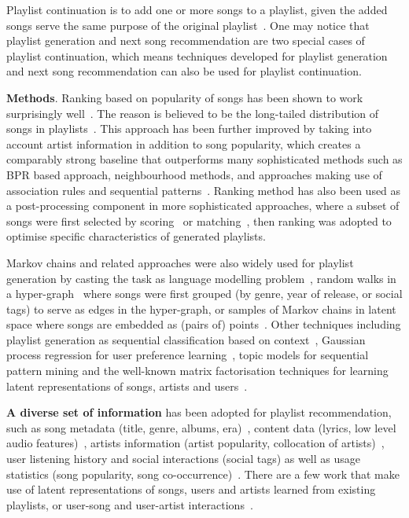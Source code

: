 Playlist continuation is to add one or more songs to a playlist,
given the added songs serve the same purpose of the original playlist~\cite{schedl2017,recsysch2018}.
One may %
notice that playlist generation and next song recommendation are two special cases
of playlist continuation, which means techniques developed for playlist generation and
next song recommendation can also be used for playlist continuation.


{\bf Methods}.
Ranking based on popularity of songs has been shown to
work surprisingly well~\cite{mcfee2012million,bonnin2013evaluating,bonnin2015automated}.
The reason is believed to be the long-tailed distribution of songs in
playlists~\cite{cremonesi2010performance,bonnin2013evaluating}.
%
This approach has been further improved by taking into account artist information in addition to
song popularity, which creates a comparably strong baseline that outperforms many sophisticated
methods such as BPR based approach, neighbourhood methods, and approaches
making use of association rules and sequential patterns~\cite{mcfee2012million,bonnin2013evaluating}.
%
Ranking method has also been used as a post-processing component in more sophisticated approaches,
where a subset of songs were first selected by scoring~\cite{jannach2015beyond} or matching~\cite{hariri2012context},
then ranking was adopted to optimise specific characteristics of generated playlists.


Markov chains and related approaches were also widely used for playlist generation by casting the task
as language modelling problem~\cite{mcfee2011natural},
random walks in a hyper-graph~\cite{mcfee2012hypergraph} where songs were first grouped (by genre,
year of release, or social tags) to serve as edges in the hyper-graph, or samples of Markov chains
in latent space where songs are embedded as (pairs of) points~\cite{chen2012playlist}.
%
Other techniques including playlist generation as sequential classification based on context~\cite{ben2017groove},
Gaussian process regression for user preference learning~\cite{platt2002learning},
topic models for sequential pattern mining and the well-known matrix factorisation techniques for learning
latent representations of songs, artists and users~\cite{mcfee2012hypergraph,chen2012playlist,ben2017groove}.


{\bf A diverse set of information} has been adopted for playlist recommendation,
such as song metadata (\eg title, genre, albums, era)~\cite{hariri2012context,platt2002learning}, %
content data (\eg lyrics, low level audio features)~\cite{mcfee2011natural,mcfee2012hypergraph,jannach2015beyond,ben2017groove},
artists information (\eg artist popularity, collocation of artists)~\cite{bonnin2013evaluating,ben2017groove},
user listening history and social interactions (\eg social tags) as well as usage statistics (\eg song popularity,
song co-occurrence)~\cite{mcfee2012hypergraph,hariri2012context,bonnin2013evaluating,jannach2015beyond,ben2017groove}.
There are a few work that make use of latent representations of songs, users and artists learned from existing playlists,
or user-song and user-artist interactions~\cite{chen2012playlist,ben2017groove}.

